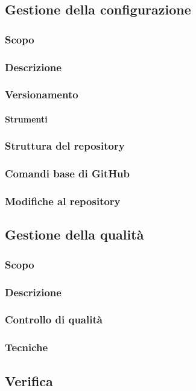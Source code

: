 \subsection{Gestione della configurazione}
\subsubsection{Scopo}
\subsubsection{Descrizione}
\subsubsection{Versionamento}
\paragraph{Strumenti}
\subsubsection{Struttura del repository}
\subsubsection{Comandi base di GitHub}
\subsubsection{Modifiche al repository}

\subsection{Gestione della qualità}
\subsubsection{Scopo}
\subsubsection{Descrizione}
\subsubsection{Controllo di qualità}
\subsubsection{Tecniche}


\subsection{Verifica}
